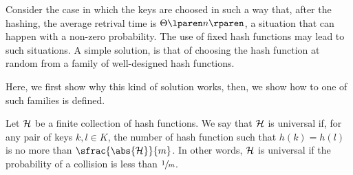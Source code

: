 \documentclass{subfiles}
\begin{document}
    Consider the case in which the keys are choosed in such a way that, after the hashing,
        the average retrival time is \(\ofT{n}\), a situation that can happen with a non-zero 
        probability. The use of fixed hash functions may lead to such situations.
        A simple solution, is that of choosing the hash function at random from a family of well-designed 
        hash functions.

    Here, we first show why this kind of solution works, 
        then, we show how to one of such families is defined.

    Let \(\mathcal{H}\) be a finite collection of hash functions. 
        We say that \(\mathcal{H}\) is universal if, for any pair of keys \(k, l \in K\), 
        the number of hash function such that \(h(k) = h(l)\) is no more than \(\sfrac{\abs{\H}}{m}\).
        In other words, \(\mathcal{H}\) is universal if the probability of a collision is less than \(\sfrac{1}{m}\).
\end{document}

